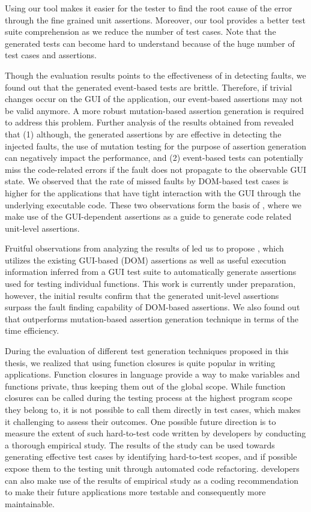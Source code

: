 Using our tool makes it easier for the tester to find the root cause of the error through the fine grained unit assertions. Moreover, our tool provides a better test suite comprehension as we reduce the number of test cases. Note that the generated tests can become hard to understand because of the huge number of test cases and assertions.

Though the evaluation results points to the effectiveness of \jseft in detecting faults, we found out that the generated event-based tests are brittle. Therefore, if trivial changes occur on the GUI of the application, our event-based assertions may not be valid anymore. A more robust mutation-based assertion generation is required to address this problem.
Further analysis of the results obtained from \jseft revealed that (1) although, the generated assertions by \jseft are effective in detecting the injected faults, the use of mutation testing for the purpose of assertion generation can negatively impact the performance, and (2) event-based tests can potentially miss the code-related errors if the fault does not propagate to the observable GUI state. We observed that the rate of missed faults by DOM-based test cases is higher for the applications that have tight interaction with the GUI through the underlying executable code. These two observations form the basis of , where we make use of the GUI-dependent assertions as a guide to generate code related unit-level assertions.

 Fruitful observations from analyzing the results of \jseft led us to propose \atrina, which utilizes the existing GUI-based (\ie DOM) assertions as well as useful execution information inferred from a GUI test suite to automatically generate assertions used for testing individual functions. This work is currently under preparation, however, the initial results confirm that the generated unit-level assertions surpass the fault finding capability of DOM-based assertions. We also found out that \atrina outperforms mutation-based assertion generation technique in terms of the time efficiency.

 During the evaluation of different test generation techniques proposed in this thesis, we realized that using function closures is quite popular in writing \javascript applications. 
Function closures in \javascript language provide a way to make variables and functions private, thus keeping them out of the global scope.
While function closures can be called during the testing process at the highest program scope they belong to, it is not possible to call them directly in test cases, which makes it challenging to assess their outcomes.
One possible future direction is to measure the extent of such hard-to-test code written by developers by conducting a thorough empirical study.
The results of the study can be used towards generating effective test cases by identifying hard-to-test scopes, and if possible expose them to the testing unit through automated code refactoring. \javascript developers can also make use of the results of empirical study as a coding recommendation to make their future applications more testable and consequently more maintainable.

